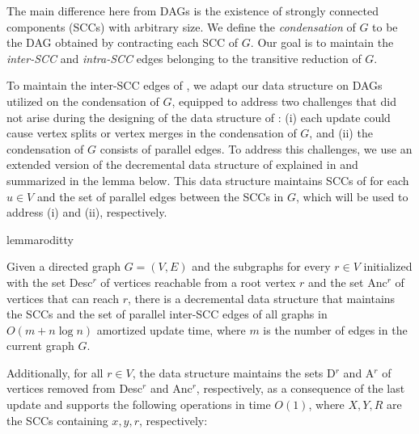 \documentclass[11pt]{article}
\newcommand{\graph}[1]{\text{\( G^{#1} \)\xspace}}
\newcommand{\TR}[0]{\text{\( G^{t} \)}\xspace}
\renewcommand{\textsc}[1]{\textnormal{\scshape #1}}
\newcommand{\desc}[1]{\textrm{{\normalfont Desc}\( ^{ #1 }\)}\xspace}
\newcommand{\D}[1]{\textrm{{\normalfont D}\(^{ #1 } \)}\xspace}
\newcommand{\anc}[1]{\textrm{{\normalfont Anc}\( ^{ #1 }\)}\xspace}
\newcommand{\A}[1]{\textrm{{\normalfont A}\( ^{ #1 } \)}\xspace}
\begin{document}
{The main difference here from DAGs is the existence of strongly connected components (SCCs) with arbitrary size.
We define the \textit{condensation} of \( G \) to be the DAG obtained by contracting each SCC of \( G \).
 Our goal is to maintain the \textit{inter-SCC} and \textit{intra-SCC} edges belonging to the transitive reduction \TR of \( G \).

To maintain the inter-SCC edges of \TR, we adapt our data structure on DAGs utilized on the condensation of \( G \),
equipped to address two challenges that did not arise during the designing of the data structure of : (i) each update could cause vertex splits or vertex merges in the condensation of \( G \), and (ii) the condensation of \( G \) consists of parallel edges.
To address this challenges, we use an extended version of the decremental data structure of \cite{Roditty:2016aa} explained in  and summarized in the lemma below.
This data structure maintains SCCs of \graph{u} for each \( u \in V \) and the set of parallel edges between the SCCs in \( G \), which will be used to address (i) and (ii), respectively.


 








\begin{restatable}{lemma}{roditty}
\label{lem:extended_roditty}

Given a directed graph \( G = (V, E) \) and the subgraphs \graph{r} for every \( r \in V \) initialized with the set \desc{r} of vertices reachable from a root vertex \( r \) and the set \anc{r} of vertices that can reach \( r \), there is a decremental data structure that maintains the SCCs and the set of parallel inter-SCC edges of all graphs in \( O(m + n \log n) \) amortized update time, where \( m \) is the number of edges in the current graph \( G \).


Additionally, for all \( r \in V \), the data structure maintains the sets \D{r} and \A{r} of vertices removed from \desc{r} and \anc{r}, respectively, as a consequence of the last update and supports the following operations in time \( O(1) \), where \( X, Y, R \) are the SCCs containing \( x, y, r \), respectively:


\end{restatable}}
\end{document}
